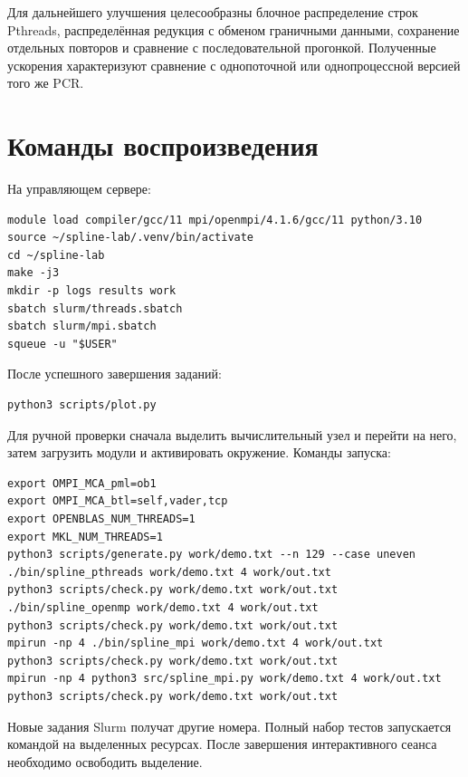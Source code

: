 \documentclass[14pt,a4paper]{extarticle}
\newcommand{\code}[1]{\texttt{\detokenize{#1}}}
\begin{document}
Для дальнейшего улучшения целесообразны блочное распределение строк Pthreads, распределённая редукция с обменом граничными данными, сохранение отдельных повторов и сравнение с последовательной прогонкой. Полученные ускорения характеризуют сравнение с однопоточной или однопроцессной версией того же PCR.

\clearpage\appendix
\section{Команды воспроизведения}
На управляющем сервере:
\begin{samepage}
\par\noindent\begin{minipage}{\linewidth}
\begin{lstlisting}
module load compiler/gcc/11 mpi/openmpi/4.1.6/gcc/11 python/3.10
source ~/spline-lab/.venv/bin/activate
cd ~/spline-lab
make -j3
mkdir -p logs results work
sbatch slurm/threads.sbatch
sbatch slurm/mpi.sbatch
squeue -u "$USER"
\end{lstlisting}
\end{minipage}\par
\end{samepage}
После успешного завершения заданий:
\begin{samepage}
\par\noindent\begin{minipage}{\linewidth}
\begin{lstlisting}
python3 scripts/plot.py
\end{lstlisting}
\end{minipage}\par
\end{samepage}
Для ручной проверки сначала выделить вычислительный узел и перейти на него, затем загрузить модули и активировать окружение. Команды запуска:
\begin{samepage}
\par\noindent\begin{minipage}{\linewidth}
\begin{lstlisting}
export OMPI_MCA_pml=ob1
export OMPI_MCA_btl=self,vader,tcp
export OPENBLAS_NUM_THREADS=1
export MKL_NUM_THREADS=1
python3 scripts/generate.py work/demo.txt --n 129 --case uneven
./bin/spline_pthreads work/demo.txt 4 work/out.txt
python3 scripts/check.py work/demo.txt work/out.txt
./bin/spline_openmp work/demo.txt 4 work/out.txt
python3 scripts/check.py work/demo.txt work/out.txt
mpirun -np 4 ./bin/spline_mpi work/demo.txt 4 work/out.txt
python3 scripts/check.py work/demo.txt work/out.txt
mpirun -np 4 python3 src/spline_mpi.py work/demo.txt 4 work/out.txt
python3 scripts/check.py work/demo.txt work/out.txt
\end{lstlisting}
\end{minipage}\par
\end{samepage}
Новые задания Slurm получат другие номера. Полный набор тестов запускается командой \code{bash tests/correctness.sh} на выделенных ресурсах. После завершения интерактивного сеанса необходимо освободить выделение.
\end{document}
